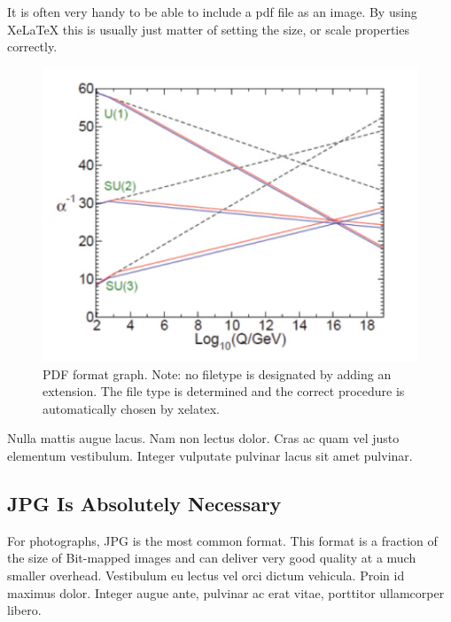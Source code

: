 It is often very handy to be able to include a pdf file as an image. By using XeLaTeX this is usually just matter of setting the size, or scale properties correctly.

\begin{figure}[htbp]
  \centering
    \includegraphics[scale=1.0]{images/graph.pdf}
    \caption[PDF format graph. Note: no filetype is designated by adding an extension.]{PDF format graph. Note: no filetype is designated by adding an extension. The file type is determined and the correct procedure is automatically chosen by xelatex.}
\end{figure}

Nulla mattis augue lacus. Nam non lectus dolor. Cras ac quam vel justo elementum vestibulum. Integer vulputate pulvinar lacus sit amet pulvinar.

\subsection{JPG Is Absolutely Necessary}

For photographs, JPG is the most common format. This format is a fraction of the size of Bit-mapped images and can deliver very good quality at a much smaller overhead. Vestibulum eu lectus vel orci dictum vehicula. Proin id maximus dolor. Integer augue ante, pulvinar ac erat vitae, porttitor ullamcorper libero. \cite{l2012wrinkle}

